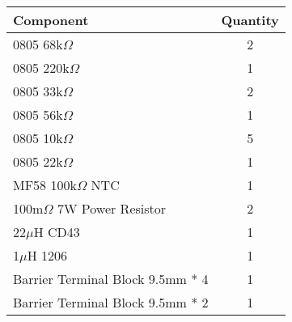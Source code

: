 \begin{center}
	\setlength\extrarowheight{7pt}
	\begin{tabular}{lc}
		{\large Component} & {\large Quantity} \\\midrule
		{\large 0805 68k$\Omega$} & {\large 2} \\
		{\large 0805 220k$\Omega$} & {\large 1} \\
		{\large 0805 33k$\Omega$} & {\large 2} \\
		{\large 0805 56k$\Omega$} & {\large 1} \\
		{\large 0805 10k$\Omega$} & {\large 5} \\
		{\large 0805 22k$\Omega$} & {\large 1} \\
		{\large MF58 100k$\Omega$ NTC} & {\large 1} \\
		{\large 100m$\Omega$ 7W Power Resistor} & {\large 2} \\
		{\large 22$\mu$H CD43} & {\large 1} \\
		{\large 1$\mu$H 1206} & {\large 1} \\
		{\large Barrier Terminal Block 9.5mm * 4} & {\large 1} \\
		{\large Barrier Terminal Block 9.5mm * 2} & {\large 1} \\
	\end{tabular}
\end{center}


\newpage

